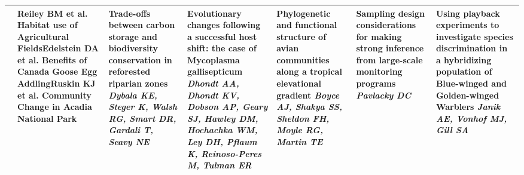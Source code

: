 \begin{tabular}{|x{0.75cm}|x{2.25cm}|a{2.25cm}|a{2.25cm}|a{2.25cm}|a{2.25cm}|x{2.25cm}|}
\hline
{}&\scriptsize Reiley BM et al. \newline \tiny Habitat use of Agricultural Fields\newline \newline \scriptsize Edelstein DA et al. \newline \tiny Benefits of Canada Goose Egg Addling\newline \newline \scriptsize Ruskin KJ et al. \newline \tiny Community Change in Acadia National Park & Trade-offs between carbon storage and biodiversity conservation in reforested riparian zones \newline \newline \textit{Dybala KE, Steger K, Walsh RG, Smart DR, Gardali T, Seavy NE} & Evolutionary changes following a successful host shift: the case of Mycoplasma gallisepticum \newline \newline \textit{Dhondt AA, Dhondt KV, Dobson AP, Geary SJ, Hawley DM, Hochachka WM, Ley DH, Pflaum K, Reinoso-Peres M, Tulman ER} & Phylogenetic and functional structure of avian communities along a tropical elevational gradient \newline \newline \textit{Boyce AJ, Shakya SS, Sheldon FH, Moyle RG, Martin TE} & Sampling design considerations for making strong inference from large-scale monitoring programs \newline \newline \textit{Pavlacky DC} & Using playback experiments to investigate species discrimination in a hybridizing population of Blue-winged and Golden-winged Warblers \newline \newline \textit{Janik AE, Vonhof MJ, Gill SA}\\
\hline

\end{tabular}
